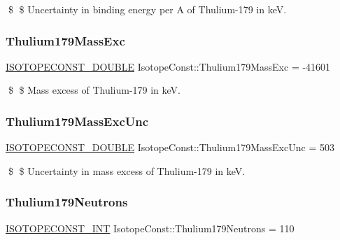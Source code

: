 \$ \$ Uncertainty in binding energy per A of Thulium-\/179 in keV. \mbox{\label{group___isotope_const-_thulium-_tm179_gac2ed472f39003d2111b4a7e7913d3837}} 
\subsubsection{\texorpdfstring{Thulium179\+Mass\+Exc}{Thulium179MassExc}}
{\footnotesize\ttfamily \mbox{\hyperlink{group___isotope_const-_macros_ga8f45a7272ce02c0b4c65c44636ed719a}{I\+S\+O\+T\+O\+P\+E\+C\+O\+N\+S\+T\+\_\+\+D\+O\+U\+B\+LE}} Isotope\+Const\+::\+Thulium179\+Mass\+Exc = -\/41601}

\$ \$ Mass excess of Thulium-\/179 in keV. \mbox{\label{group___isotope_const-_thulium-_tm179_ga0bac36201347c778ef41d23cab5d146f}} 
\subsubsection{\texorpdfstring{Thulium179\+Mass\+Exc\+Unc}{Thulium179MassExcUnc}}
{\footnotesize\ttfamily \mbox{\hyperlink{group___isotope_const-_macros_ga8f45a7272ce02c0b4c65c44636ed719a}{I\+S\+O\+T\+O\+P\+E\+C\+O\+N\+S\+T\+\_\+\+D\+O\+U\+B\+LE}} Isotope\+Const\+::\+Thulium179\+Mass\+Exc\+Unc = 503}

\$ \$ Uncertainty in mass excess of Thulium-\/179 in keV. \mbox{\label{group___isotope_const-_thulium-_tm179_ga580f970ae92bb6d955415628bc47a4f8}} 
\subsubsection{\texorpdfstring{Thulium179\+Neutrons}{Thulium179Neutrons}}
{\footnotesize\ttfamily \mbox{\hyperlink{group___isotope_const-_macros_ga5f18360b3e99483a35c32d789e62621c}{I\+S\+O\+T\+O\+P\+E\+C\+O\+N\+S\+T\+\_\+\+I\+NT}} Isotope\+Const\+::\+Thulium179\+Neutrons = 110}

